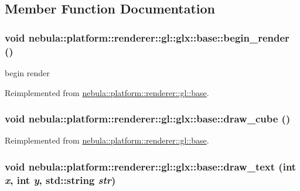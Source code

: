 \subsection{Member Function Documentation}
\hypertarget{classnebula_1_1platform_1_1renderer_1_1gl_1_1glx_1_1base_abfc5fa20a21e5278d6a49103f017c8e6}{
\subsubsection[{begin\_\-render}]{\setlength{\rightskip}{0pt plus 5cm}void nebula::platform::renderer::gl::glx::base::begin\_\-render ()}}
\label{classnebula_1_1platform_1_1renderer_1_1gl_1_1glx_1_1base_abfc5fa20a21e5278d6a49103f017c8e6}


begin render 

Reimplemented from \hyperlink{classnebula_1_1platform_1_1renderer_1_1gl_1_1base_a992eba193eb6f08eea3f22363ff5ee18}{nebula::platform::renderer::gl::base}.\hypertarget{classnebula_1_1platform_1_1renderer_1_1gl_1_1glx_1_1base_af6bfad8ac789393e50da7f32ea45817e}{
\subsubsection[{draw\_\-cube}]{\setlength{\rightskip}{0pt plus 5cm}void nebula::platform::renderer::gl::glx::base::draw\_\-cube ()}}
\label{classnebula_1_1platform_1_1renderer_1_1gl_1_1glx_1_1base_af6bfad8ac789393e50da7f32ea45817e}


Reimplemented from \hyperlink{classnebula_1_1platform_1_1renderer_1_1gl_1_1base_a4b143fe5c7fa7fe15dc0bf2f30630451}{nebula::platform::renderer::gl::base}.\hypertarget{classnebula_1_1platform_1_1renderer_1_1gl_1_1glx_1_1base_a3bed53ee587076a42419e5323ffd4b13}{
\subsubsection[{draw\_\-text}]{\setlength{\rightskip}{0pt plus 5cm}void nebula::platform::renderer::gl::glx::base::draw\_\-text (int {\em x}, \/  int {\em y}, \/  std::string {\em str})}}
\label{classnebula_1_1platform_1_1renderer_1_1gl_1_1glx_1_1base_a3bed53ee587076a42419e5323ffd4b13}


